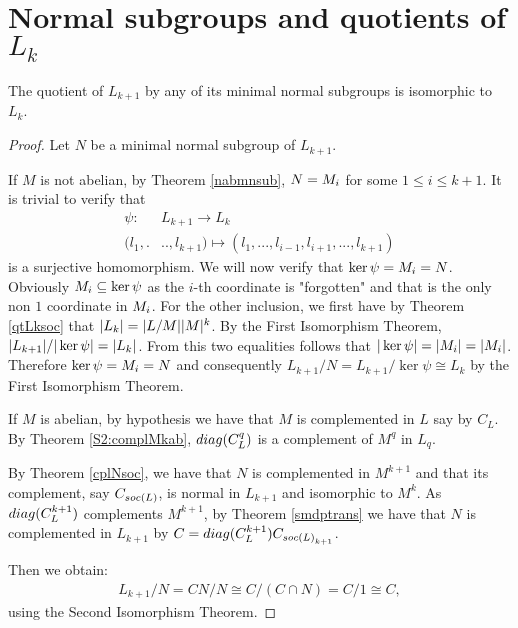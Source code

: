 \section{Normal subgroups and quotients of \texorpdfstring{$L_k$}{Lk}}

\begin{theorem}
    \label{S2:QLkmnsub}
    The quotient of $L_{k+1}$ by any of its minimal normal subgroups is isomorphic to $L_k$.
\end{theorem}

\begin{proof}
    Let $N$ be a minimal normal subgroup of $L_{k+1}$.

    If $M$ is not abelian, by Theorem \ref{nabmnsub}, $N = M_{i}$ for some $1 \le i \le k+1$. It is trivial to verify that
    \begin{align*}
        \psi \colon &L_{k+1} \longrightarrow L_k \\
                (l_1,.&..,l_{k+1}) \mapsto (l_1,...,l_{i-1},l_{i+1},...,l_{k+1})
    \end{align*}
    is a surjective homomorphism. We will now verify that $\ker \psi = M_{i} = N$. Obviously $M_{i} \subseteq \ker \psi$ as the $i$-th coordinate is "forgotten" and that is the only non $1$ coordinate in $M_{i}$. For the other inclusion, we first have by Theorem \ref{qtLksoc} that $| L_k | = | L/M | | M |^k$. By the First Isomorphism Theorem, $| L_{k+1} |/| \ker{\psi} | = | L_k |$. From this two equalities follows that $| \ker \psi | = | M_{i} | = | M_{i} |$. Therefore $\ker \psi = M_{i} = N$ and consequently
    $L_{k+1}/N = L_{k+1}/\ker \psi \cong L_k$ by the First Isomorphism Theorem.

    If $M$ is abelian, by hypothesis we have that $M$ is complemented in $L$ say by $C_L$. By Theorem \ref{S2:complMkab}, $diag({C_L^q})$ is a complement of $M^q$ in $L_q$.

    By Theorem \ref{cplNsoc}, we have that $N$ is complemented in $M^{k+1}$ and that its complement, say $C_{soc {(L)}}$, is normal in $L_{k+1}$ and isomorphic to $M^{k}$. 
    As $diag({C_L^{k+1}})$ complements $M^{k+1}$, by Theorem \ref{smdptrans} we have that $N$ is complemented in $L_{k+1}$ by $C=diag({C_L^{k+1}})C_{soc {(L)}_{k+1}}$.

    Then we obtain:
    \begin{align*}
        L_{k+1}/N = CN/N \cong C/(C \cap N) = C/1 \cong C,
    \end{align*}
    using the Second Isomorphism Theorem.


\end{proof}

